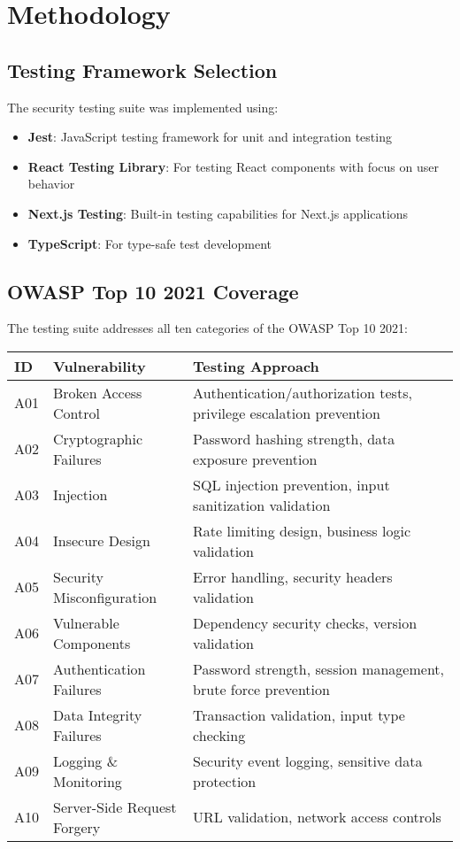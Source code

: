 \documentclass[12pt]{article}
\begin{document}
\section{Methodology}

\subsection{Testing Framework Selection}
The security testing suite was implemented using:
\begin{itemize}
    \item \textbf{Jest}: JavaScript testing framework for unit and integration testing
    \item \textbf{React Testing Library}: For testing React components with focus on user behavior
    \item \textbf{Next.js Testing}: Built-in testing capabilities for Next.js applications
    \item \textbf{TypeScript}: For type-safe test development
\end{itemize}

\subsection{OWASP Top 10 2021 Coverage}
The testing suite addresses all ten categories of the OWASP Top 10 2021:

\begin{longtable}{|p{1cm}|p{4cm}|p{8cm}|}
\hline
\textbf{ID} & \textbf{Vulnerability} & \textbf{Testing Approach} \\
\hline
A01 & Broken Access Control & Authentication/authorization tests, privilege escalation prevention \\
\hline
A02 & Cryptographic Failures & Password hashing strength, data exposure prevention \\
\hline
A03 & Injection & SQL injection prevention, input sanitization validation \\
\hline
A04 & Insecure Design & Rate limiting design, business logic validation \\
\hline
A05 & Security Misconfiguration & Error handling, security headers validation \\
\hline
A06 & Vulnerable Components & Dependency security checks, version validation \\
\hline
A07 & Authentication Failures & Password strength, session management, brute force prevention \\
\hline
A08 & Data Integrity Failures & Transaction validation, input type checking \\
\hline
A09 & Logging \& Monitoring & Security event logging, sensitive data protection \\
\hline
A10 & Server-Side Request Forgery & URL validation, network access controls \\
\hline
\end{longtable}
\end{document}
